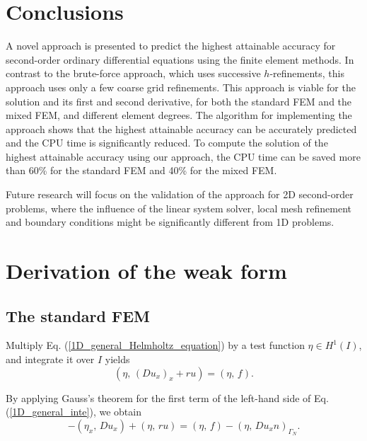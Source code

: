 \documentclass[review,3p]{elsarticle}
\begin{document}
\section{Conclusions}		\label{paragraph on conclusion}

A novel approach is presented to predict the highest attainable accuracy for second-order ordinary differential equations using the finite element methods.
In contrast to the brute-force approach, which uses successive $h$-refinements, this approach uses only a few coarse grid refinements. 
This approach is viable for the solution and its first and second derivative, for both the standard FEM and the mixed FEM, and different element degrees.
The algorithm for implementing the approach shows that the highest attainable accuracy can be accurately predicted and the CPU time is significantly reduced.
To compute the solution of the highest attainable accuracy using our approach, the CPU time can be saved more than 60\% for the standard FEM and 40\% for the mixed FEM.

Future research will focus on the validation of the approach for 2D second-order problems, where the influence of the linear system solver, local mesh refinement and boundary conditions might be significantly different from 1D problems. 

\appendix

\section{Derivation of the weak form}		\label{weak form appendix}

\subsection{The standard FEM}		\label{derivation_weak_form_SM}

Multiply Eq. (\ref{1D_general_Helmholtz_equation}) by a test function $\eta \in H ^1 (I)$, and integrate it over $I$ yields
\begin{equation}
(\eta, \, \left(D u_x \right)_x + ru) = (\eta, \, f). \label{1D_general_inte}
\end{equation}

By applying Gauss's theorem for the first term of the left-hand side of Eq. (\ref{1D_general_inte}), we obtain
\begin{equation}
 -({\eta} _x, \, D {u} _{ x }) + (\eta, \, ru) = (\eta, \, f) - \left( \eta, \, D u_x n \right)_{ {\Gamma_N}}.		\label{1D_general_gauss}
\end{equation}
\end{document}
